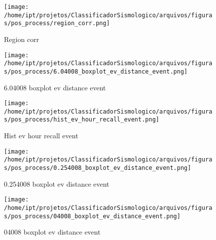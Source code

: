                     \begin{figure}[H]
                        \centering
                        \texttt{[image: /home/ipt/projetos/ClassificadorSismologico/arquivos/figuras/pos\_process/region\_corr.png]}
                        \caption{Region corr}
                        \label{fig:region_corr}
                    \end{figure}
                

                    \begin{figure}[H]
                        \centering
                        \texttt{[image: /home/ipt/projetos/ClassificadorSismologico/arquivos/figuras/pos\_process/6.04008\_boxplot\_ev\_distance\_event.png]}
                        \caption{6.04008 boxplot ev distance event}
                        \label{fig:6.04008_boxplot_ev_distance_event}
                    \end{figure}
                

                    \begin{figure}[H]
                        \centering
                        \texttt{[image: /home/ipt/projetos/ClassificadorSismologico/arquivos/figuras/pos\_process/hist\_ev\_hour\_recall\_event.png]}
                        \caption{Hist ev hour recall event}
                        \label{fig:hist_ev_hour_recall_event}
                    \end{figure}
                

                    \begin{figure}[H]
                        \centering
                        \texttt{[image: /home/ipt/projetos/ClassificadorSismologico/arquivos/figuras/pos\_process/0.254008\_boxplot\_ev\_distance\_event.png]}
                        \caption{0.254008 boxplot ev distance event}
                        \label{fig:0.254008_boxplot_ev_distance_event}
                    \end{figure}
                

                    \begin{figure}[H]
                        \centering
                        \texttt{[image: /home/ipt/projetos/ClassificadorSismologico/arquivos/figuras/pos\_process/04008\_boxplot\_ev\_distance\_event.png]}
                        \caption{04008 boxplot ev distance event}
                        \label{fig:04008_boxplot_ev_distance_event}
                    \end{figure}
                

